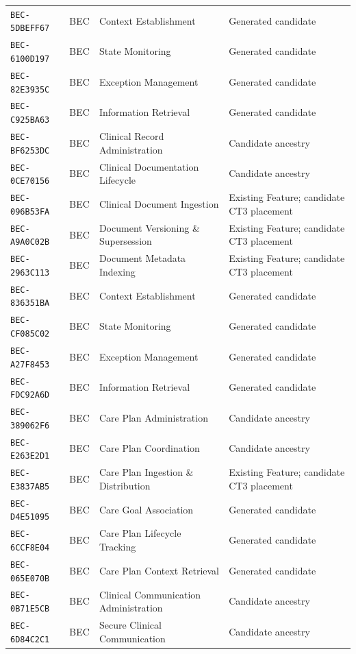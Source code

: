 \documentclass[11pt,a4paper,openany]{book}
\begin{document}
\begin{longtable}{@{}p{.19\linewidth}p{.12\linewidth}p{.39\linewidth}p{.24\linewidth}@{}}
\texttt{BEC-5DBEFF67} & BEC & Context Establishment & Generated candidate \\
\texttt{BEC-6100D197} & BEC & State Monitoring & Generated candidate \\
\texttt{BEC-82E3935C} & BEC & Exception Management & Generated candidate \\
\texttt{BEC-C925BA63} & BEC & Information Retrieval & Generated candidate \\
\texttt{BEC-BF6253DC} & BEC & Clinical Record Administration & Candidate ancestry \\
\texttt{BEC-0CE70156} & BEC & Clinical Documentation Lifecycle & Candidate ancestry \\
\texttt{BEC-096B53FA} & BEC & Clinical Document Ingestion & Existing Feature; candidate CT3 placement \\
\texttt{BEC-A9A0C02B} & BEC & Document Versioning \& Supersession & Existing Feature; candidate CT3 placement \\
\texttt{BEC-2963C113} & BEC & Document Metadata Indexing & Existing Feature; candidate CT3 placement \\
\texttt{BEC-836351BA} & BEC & Context Establishment & Generated candidate \\
\texttt{BEC-CF085C02} & BEC & State Monitoring & Generated candidate \\
\texttt{BEC-A27F8453} & BEC & Exception Management & Generated candidate \\
\texttt{BEC-FDC92A6D} & BEC & Information Retrieval & Generated candidate \\
\texttt{BEC-389062F6} & BEC & Care Plan Administration & Candidate ancestry \\
\texttt{BEC-E263E2D1} & BEC & Care Plan Coordination & Candidate ancestry \\
\texttt{BEC-E3837AB5} & BEC & Care Plan Ingestion \& Distribution & Existing Feature; candidate CT3 placement \\
\texttt{BEC-D4E51095} & BEC & Care Goal Association & Generated candidate \\
\texttt{BEC-6CCF8E04} & BEC & Care Plan Lifecycle Tracking & Generated candidate \\
\texttt{BEC-065E070B} & BEC & Care Plan Context Retrieval & Generated candidate \\
\texttt{BEC-0B71E5CB} & BEC & Clinical Communication Administration & Candidate ancestry \\
\texttt{BEC-6D84C2C1} & BEC & Secure Clinical Communication & Candidate ancestry \\

\end{longtable}
\end{document}
